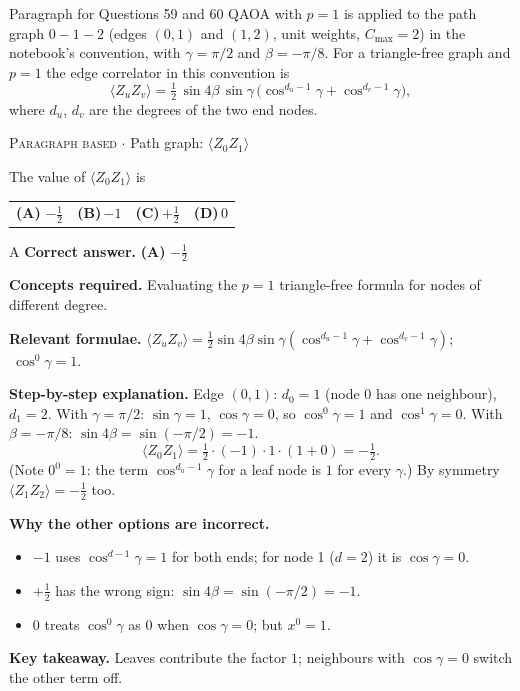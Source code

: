 \documentclass[11pt,a4paper]{article}
\newcommand{\optlabel}[1]{\textbf{(#1)}}
\newcommand{\correctlabel}[1]{\textcolor{okgreen}{\textbf{(#1)}\,\ding{51}}}
\newenvironment{qitem}[1]{\begin{list}{}{\setlength{\leftmargin}{3.3em}\setlength{\labelwidth}{3.1em}%
  \setlength{\labelsep}{0.2em}\setlength{\topsep}{3pt}\setlength{\parsep}{3pt}}\item[\textbf{Q.#1}\hfill]}{\end{list}}
\newcommand{\qsep}{\par\vspace{2pt}{\color{black!15}\hrule}\vspace{4pt}}
\newcommand{\qmeta}[2]{{\footnotesize\color{black!60}\textsc{#1} \;$\cdot$\; #2}\par}
\begin{document}
\begin{passagebox}{Paragraph for Questions 59 and 60}
QAOA with $p = 1$ is applied to the path graph $0 - 1 - 2$ (edges $(0,1)$ and $(1,2)$, unit weights,
$C_{\max} = 2$) in the notebook's convention, with $\gamma = \pi/2$ and $\beta = -\pi/8$. For a triangle-free graph and $p = 1$
the edge correlator in this convention is
\[ \langle Z_uZ_v\rangle = \tfrac12\,\sin4\beta\,\sin\gamma\,\big(\cos^{d_u - 1}\gamma + \cos^{d_v - 1}\gamma\big), \]
where $d_u$, $d_v$ are the degrees of the two end nodes.
\end{passagebox}
\begin{qitem}{59}
\qmeta{Paragraph based}{Path graph: $\langle Z_0Z_1\rangle$}
The value of $\langle Z_0Z_1\rangle$ is
\par\smallskip\noindent\begin{tabularx}{\linewidth}{@{}*{4}{L}@{}}
\correctlabel{A}\,$-\tfrac12$ & \optlabel{B}\,$-1$ & \optlabel{C}\,$+\tfrac12$ & \optlabel{D}\,$0$
\end{tabularx}
\end{qitem}
\begin{solbox}{A}
\textbf{\color{brand}Correct answer.} \textcolor{okgreen}{\textbf{(A)}} $-\tfrac12$

\textbf{\color{brand}Concepts required.} Evaluating the $p = 1$ triangle-free formula for nodes of different degree.

\textbf{\color{brand}Relevant formulae.} $\langle Z_uZ_v\rangle = \tfrac12\sin4\beta\sin\gamma(\cos^{d_u-1}\gamma + \cos^{d_v-1}\gamma)$; $\ \cos^0\gamma = 1$.

\textbf{\color{brand}Step-by-step explanation.} Edge $(0,1)$: $d_0 = 1$ (node 0 has one neighbour), $d_1 = 2$. With $\gamma = \pi/2$: $\sin\gamma = 1$, $\cos\gamma = 0$, so
$\cos^{0}\gamma = 1$ and $\cos^{1}\gamma = 0$. With $\beta = -\pi/8$: $\sin4\beta = \sin(-\pi/2) = -1$.
\[ \langle Z_0Z_1\rangle = \tfrac12\cdot(-1)\cdot1\cdot(1 + 0) = -\tfrac12 . \]
(Note $0^0 = 1$: the term $\cos^{d_u-1}\gamma$ for a leaf node is $1$ for every $\gamma$.) By symmetry $\langle Z_1Z_2\rangle = -\tfrac12$ too.

\textbf{\color{brand}Why the other options are incorrect.}
\begin{itemize}[leftmargin=2.4em, itemsep=1pt, topsep=2pt]
\item[\textbf{(B)}] $-1$ uses $\cos^{d-1}\gamma = 1$ for both ends; for node 1 ($d = 2$) it is $\cos\gamma = 0$.
\item[\textbf{(C)}] $+\frac12$ has the wrong sign: $\sin4\beta = \sin(-\pi/2) = -1$.
\item[\textbf{(D)}] $0$ treats $\cos^0\gamma$ as $0$ when $\cos\gamma = 0$; but $x^0 = 1$.
\end{itemize}
\textbf{\color{brand}Key takeaway.} Leaves contribute the factor $1$; neighbours with $\cos\gamma = 0$ switch the other term off.
\end{solbox}
\qsep
\end{document}
